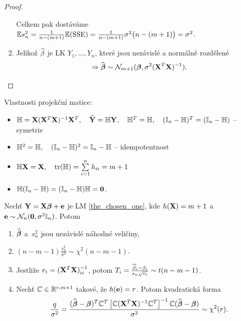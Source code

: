 \begin{proof}
\begin{enumerate}
Celkem pak dostáváme $\mathbb{E} s_n^2 = \frac{1}{n - (m + 1)} \mathbb{E} (\mathrm{SSE}) = \frac{1}{n - (m + 1)} \sigma^2\big(n - (m + 1)\big) = \sigma^2$.

\item
 Jelikož $\widehat{\beta}$ je LK $Y_1,\dots, Y_n$, které jsou nezávislé a normálně rozdělené $$\Rightarrow \widehat{\boldsymbol{\beta}} \sim \mathcal{N}_{m+1} (\boldsymbol{\beta}, \sigma^2(\mathbf{X}^T \mathbf{X})^{-1}).$$
\end{enumerate}
\end{proof}

\begin{remark}
	Vlastnosti projekční matice:
	\begin{itemize}
		\item $\mathbb{H} = \mathbf{X} (\mathbf{X}^T \mathbf{X})^{-1} \mathbf{X}^T, \quad \widehat{\mathbf{Y}} = \mathbb{H} \mathbf{Y}, \quad \mathbb{H}^T = \mathbb{H}, \quad (\mathbb{I}_{n} - \mathbb{H})^T = (\mathbb{I}_{n} - \mathbb{H})$ -- symetrie
		\item $\mathbb{H}^2 = \mathbb{H}, \quad (\mathbb{I}_{n} - \mathbb{H})^2 = \mathbb{I}_{n} - \mathbb{H}$ -- idempotentnost
		\item $\mathbb{H} \mathbf{X} = \mathbf{X}, \quad \text{tr}(\mathbb{H}) = \sum\limits_{i=1}^{n} h_{ii} = m + 1$
		\item $\mathbb{H}(\mathbb{I}_{n} - \mathbb{H}) = (\mathbb{I}_{n} - \mathbb{H}) \mathbb{H} = \boldsymbol{0}$.
	\end{itemize}
\end{remark}

\begin{theorem}
	Nechť $\mathbf{Y} = \mathbf{X} \boldsymbol{\beta} + \mathbf{e}$ je LM \eqref{the_chosen_one}, kde $h(\mathbf{X}) = m + 1$ a~$\mathbf{e} \sim \mathcal{N}_n(\boldsymbol{0},\sigma^2 \mathbb{I}_{n})$. Potom
	\begin{enumerate}
		\item $\widehat{\boldsymbol{\beta}}$ a~$s_n^2$ jsou nezávislé náhodné veličiny,
		\item $(n - m - 1) \frac{s_n^2}{\sigma^2} \sim \chi^2(n - m - 1)$.
		\item Jestliže $v_i = (\mathbf{X}^T \mathbf{X})_{ii}^{-1}$, potom $T_i = \frac{\widehat{\beta}_i - \beta_i}{s_n \sqrt{v_i}} \sim t(n-m-1)$.
		\item Nechť $\mathbb{C} \in \mathbb{R}^{r,m+1}$ takové, že $h(\mathbf{e}) = r$. Potom kvadratická forma
		 $$
			\frac{q}{\sigma^2} = \frac{(\widehat{\boldsymbol{\beta}} - \boldsymbol{\beta})^T \mathbb{C}^T \left[\mathbb{C} (\mathbf{X}^T \mathbf{X})^{-1} \mathbb{C}^T \right]^{-1} \mathbb{C} (\widehat{\boldsymbol{\beta}} - \boldsymbol{\beta})}{\sigma^2} \sim \chi^2(r).
		 $$
	\end{enumerate}
\end{theorem}

